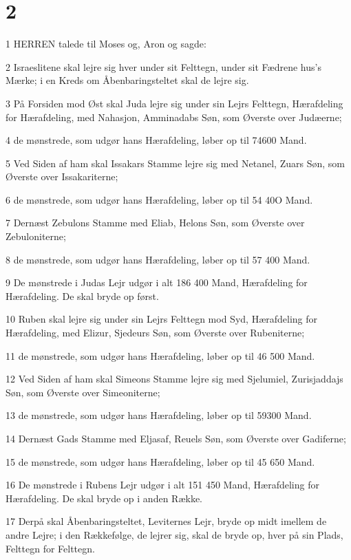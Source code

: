 \chapter{2}

\par 1 HERREN talede til Moses og, Aron og sagde:
\par 2 Israeslitene skal lejre sig hver under sit Felttegn, under sit Fædrene hus's Mærke; i en Kreds om Åbenbaringsteltet skal de lejre sig.
\par 3 På Forsiden mod Øst skal Juda lejre sig under sin Lejrs Felttegn, Hærafdeling for Hærafdeling, med Nahasjon, Amminadabs Søn, som Øverste over Judæerne;
\par 4 de mønstrede, som udgør hans Hærafdeling, løber op til 74600 Mand.
\par 5 Ved Siden af ham skal Issakars Stamme lejre sig med Netanel, Zuars Søn, som Øverste over Issakariterne;
\par 6 de mønstrede, som udgør hans Hærafdeling, løber op til 54 40O Mand.
\par 7 Dernæst Zebulons Stamme med Eliab, Helons Søn, som Øverste over Zebuloniterne;
\par 8 de mønstrede, som udgør hans Hærafdeling, løber op til 57 400 Mand.
\par 9 De mønstrede i Judas Lejr udgør i alt 186 400 Mand, Hærafdeling for Hærafdeling. De skal bryde op først.
\par 10 Ruben skal lejre sig under sin Lejrs Felttegn mod Syd, Hærafdeling for Hærafdeling, med Elizur, Sjedeurs Søn, som Øverste over Rubeniterne;
\par 11 de mønstrede, som udgør hans Hærafdeling, løber op til 46 500 Mand.
\par 12 Ved Siden af ham skal Simeons Stamme lejre sig med Sjelumiel, Zurisjaddajs Søn, som Øverste over Simeoniterne;
\par 13 de mønstrede, som udgør hans Hærafdeling, løber op til 59300 Mand.
\par 14 Dernæst Gads Stamme med Eljasaf, Reuels Søn, som Øverste over Gadiferne;
\par 15 de mønstrede, som udgør hans Hærafdeling, løber op til 45 650 Mand.
\par 16 De mønstrede i Rubens Lejr udgør i alt 151 450 Mand, Hærafdeling for Hærafdeling. De skal bryde op i anden Række.
\par 17 Derpå skal Åbenbaringsteltet, Leviternes Lejr, bryde op midt imellem de andre Lejre; i den Rækkefølge, de lejrer sig, skal de bryde op, hver på sin Plads, Felttegn for Felttegn.

